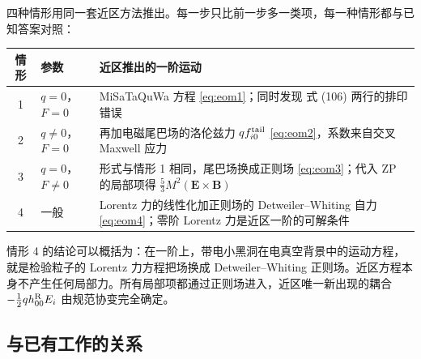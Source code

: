 \documentclass[11pt,a4paper]{ctexart}
\numberwithin{equation}{section}
\begin{document}
四种情形用同一套近区方法推出。每一步只比前一步多一类项，每一种情形都与已知答案对照：
\begin{center}\small
\begin{tabular}{cp{}p{}}
\hline
情形 & 参数 & 近区推出的一阶运动\\
\hline
1 & $q=0$，$F=0$ & MiSaTaQuWa 方程 \eqref{eq:eom1}；同时发现 \citet{GrallaWald2008} 式 (106) 两行的排印错误\\
2 & $q\neq0$，$F=0$ & 再加电磁尾巴场的洛伦兹力 $qf^{\rm tail}_{i0}$ \eqref{eq:eom2}，系数来自交叉 Maxwell 应力\\
3 & $q=0$，$F\neq0$ & 形式与情形 1 相同，尾巴场换成正则场 \eqref{eq:eom3}；代入 ZP 的局部项得 $\tfrac53M^2(\boldsymbol E\times\boldsymbol B)$\\
4 & 一般 & Lorentz 力的线性化加正则场的 Detweiler--Whiting 自力 \eqref{eq:eom4}；零阶 Lorentz 力是近区一阶的可解条件\\
\hline
\end{tabular}
\end{center}
情形 4 的结论可以概括为：在一阶上，带电小黑洞在电真空背景中的运动方程，就是检验粒子的 Lorentz 力方程把场换成 Detweiler--Whiting 正则场。近区方程本身不产生任何局部力。所有局部项都通过正则场进入，近区唯一新出现的耦合 $-\tfrac12qh^{\rm R}_{00}E_i$ 由规范协变完全确定。

\subsection{与已有工作的关系}
\end{document}
